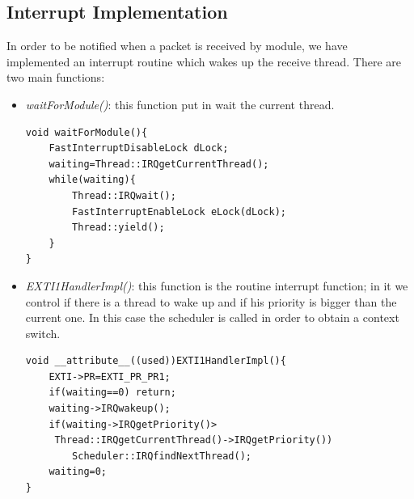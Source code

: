 \documentclass[11pt,a4paper,oneside]{article}
\begin{document}
\subsection{Interrupt Implementation}
In order to be notified when a packet is received by module, we have implemented an interrupt routine which wakes up the receive thread. There are two main functions:
\begin{itemize}
\item {\itshape waitForModule()}: this function put in wait the current thread.
\lstset{numbers=left,numberstyle=\tiny}
\begin{lstlisting}[frame=single]
void waitForModule(){
    FastInterruptDisableLock dLock; 
    waiting=Thread::IRQgetCurrentThread();
    while(waiting){
        Thread::IRQwait(); 
        FastInterruptEnableLock eLock(dLock); 
        Thread::yield(); 
    }
}
\end{lstlisting}
\item {\itshape EXTI1HandlerImpl()}: this function is the routine interrupt function; in it we control if there is a thread to wake up and if his priority is bigger than the current one. In this case the scheduler is called in order to obtain a context switch.
\lstset{numbers=left,numberstyle=\tiny}
\begin{lstlisting}[frame=single]
void __attribute__((used))EXTI1HandlerImpl(){
    EXTI->PR=EXTI_PR_PR1;
    if(waiting==0) return;
    waiting->IRQwakeup(); 
    if(waiting->IRQgetPriority()>
     Thread::IRQgetCurrentThread()->IRQgetPriority())
        Scheduler::IRQfindNextThread();
    waiting=0;
}
\end{lstlisting}
\end{itemize}


\newpage
\end{document}
